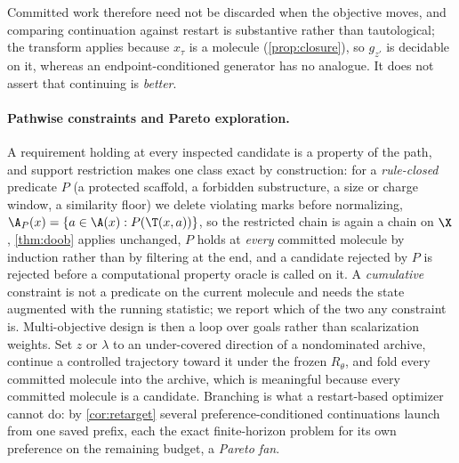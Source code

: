 Committed work therefore need not be discarded when the objective moves, and comparing continuation against restart is substantive rather than tautological; the transform applies because $x_\tau$ is a molecule (\cref{prop:closure}), so $g_{z'}$ is decidable on it, whereas an endpoint-conditioned generator has no analogue. It does not assert that continuing is \emph{better}.

\paragraph{Pathwise constraints and Pareto exploration.}
\label{sec:pathwise}
A requirement holding at every inspected candidate is a property of the path, and support restriction makes one class exact by construction: for a \emph{rule-closed} predicate $P$ (a protected scaffold, a forbidden substructure, a size or charge window, a similarity floor) we delete violating marks before normalizing, $\A_P(x)=\{a\in\A(x):P(\T(x,a))\}$, so the restricted chain is again a chain on $\X$, \cref{thm:doob} applies unchanged, $P$ holds at \emph{every} committed molecule by induction rather than by filtering at the end, and a candidate rejected by $P$ is rejected before a computational property oracle is called on it.
A \emph{cumulative} constraint is not a predicate on the current molecule and needs the state augmented with the running statistic; we report which of the two any constraint is.
Multi-objective design is then a loop over goals rather than scalarization weights. Set $z$ or $\lambda$ to an under-covered direction of a nondominated archive, continue a controlled trajectory toward it under the frozen $R_\theta$, and fold every committed molecule into the archive, which is meaningful because every committed molecule is a candidate.
Branching is what a restart-based optimizer cannot do: by \cref{cor:retarget} several preference-conditioned continuations launch from one saved prefix, each the exact finite-horizon problem for its own preference on the remaining budget, a \emph{Pareto fan}.
